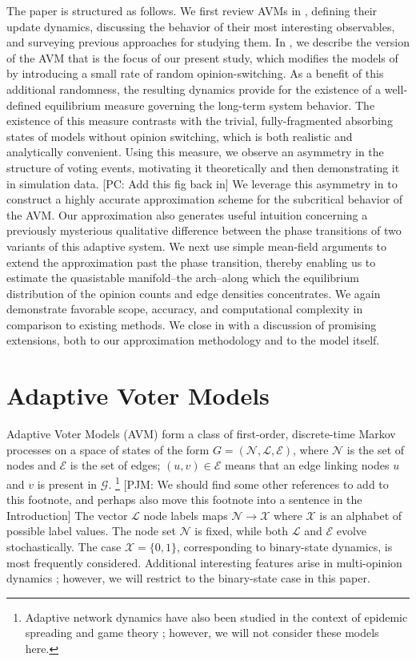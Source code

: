 \documentclass[review, onefignum, onetabnum]{siamart171218}
\newcommand{\pjm}[1]{{\color{blue}[PJM: #1]}}
\newcommand{\pc}[1]{{\color{comment_purple}[PC: #1]}}
\begin{document}
	The paper is structured as follows. 
	We first review AVMs in , defining their update dynamics, discussing the behavior of their most interesting observables, and surveying previous approaches for studying them. 
	In , we describe the version of the AVM that is the focus of our present study, which modifies the models of \cite{Durrett2012} by introducing a small rate of random opinion-switching. 
	As a benefit of this additional randomness, the resulting dynamics provide for the existence of a well-defined equilibrium measure governing the long-term system behavior. 
	The existence of this measure contrasts with the trivial, fully-fragmented absorbing states of models without opinion switching, which is both realistic and analytically convenient. 
	Using this measure, we observe an asymmetry in the structure of voting events, motivating it theoretically and then demonstrating it in simulation data. \pc{Add this fig back in} 
	We leverage this asymmetry in  to construct a highly accurate approximation scheme for the subcritical behavior of the AVM. 
	Our approximation also generates useful intuition concerning a previously mysterious qualitative difference between the phase transitions of two variants of this adaptive system.
	We next use simple mean-field arguments to extend the approximation past the phase transition, thereby enabling us to estimate the quasistable manifold--the arch--along which the equilibrium distribution of the opinion counts and edge densities concentrates.
	We again demonstrate favorable scope, accuracy, and computational complexity in comparison to existing methods.
	We close in  with a discussion of promising extensions, both to our approximation methodology and to the model itself. 
	
\section{Adaptive Voter Models} \label{sec:AVMs}
	
	Adaptive Voter Models (AVM) form a class of first-order, discrete-time Markov processes on a space of states of the form $G = (\mathcal{N}, \mathcal{L}, \mathcal{E})$, where $\mathcal{N}$ is the set of nodes and $\mathcal{E}$ is the set of edges; $(u,v) \in \mathcal{E}$ means that an edge linking nodes $u$and $v$ is present in $\mathcal{G}$.
	\footnote{Adaptive network dynamics have also been studied in the context of epidemic spreading \cite{Marceau2010,Lee2017} and game theory \cite{Malik2016}; however, we will not consider these models here.} \pjm{We should find some other references to add to this footnote, and perhaps also move this footnote into a sentence in the Introduction} 
    The vector $\mathcal{L}$  node labels maps $\mathcal{N} \rightarrow \mathcal{X}$ where $\mathcal{X}$ is an alphabet of possible label values. 
	The node set $\mathcal{N}$ is fixed, while both $\mathcal{L}$ and $\mathcal{E}$ evolve stochastically.
	The case $\mathcal{X} = \{0,1\}$, corresponding to binary-state dynamics, is most frequently considered. 
	Additional interesting features arise in multi-opinion dynamics \cite{Holme2006, Shi2013}; however, we will restrict to the binary-state case in this paper. 
	
\end{document}
